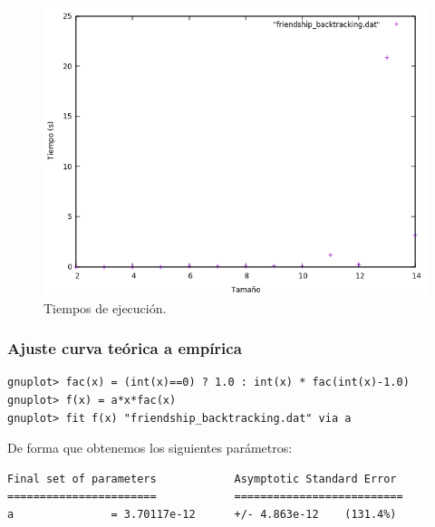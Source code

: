 \begin{figure}[H]
    \begin{center}
        \includegraphics[scale=0.7]{imagenes/bt.png}
        \caption{Tiempos de ejecución.}
        \label{fig19}
    \end{center}
\end{figure}

\subsubsection{Ajuste curva teórica a empírica}

\begin{shaded*}
\begin{verbatim}
gnuplot> fac(x) = (int(x)==0) ? 1.0 : int(x) * fac(int(x)-1.0)
gnuplot> f(x) = a*x*fac(x)
gnuplot> fit f(x) "friendship_backtracking.dat" via a
\end{verbatim}
\end{shaded*}

De forma que obtenemos los siguientes parámetros:

\begin{shaded*}
\begin{verbatim}
Final set of parameters            Asymptotic Standard Error
=======================            ==========================
a               = 3.70117e-12      +/- 4.863e-12    (131.4%)
\end{verbatim}
\end{shaded*}

